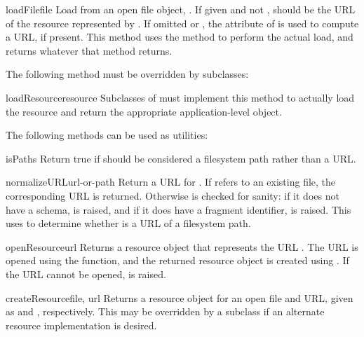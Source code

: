 \documentclass{howto}
\begin{document}
\begin{methoddesc}[loader]{loadFile}{file}
  Load from an open file object, .  If given and not
  ,  should be the URL of the resource represented
  by .  If omitted or , the 
  attribute of  is used to compute a  URL, if
  present.
  This method uses the  method to perform the
  actual load, and returns whatever that method returns.
\end{methoddesc}

The following method must be overridden by subclasses:

\begin{methoddesc}[loader]{loadResource}{resource}
  Subclasses of  must implement this method to
  actually load the resource and return the appropriate
  application-level object.
\end{methoddesc}

The following methods can be used as utilities:

\begin{methoddesc}[loader]{isPath}{s}
  Return true if  should be considered a filesystem path rather
  than a URL.
\end{methoddesc}

\begin{methoddesc}[loader]{normalizeURL}{url-or-path}
  Return a URL for .  If  refers to
  an existing file, the corresponding  URL is returned.
  Otherwise  is checked for sanity: if it
  does not have a schema,  is raised, and if it
  does have a fragment identifier,  is
  raised.
  This uses  to determine whether 
  is a URL of a filesystem path.
\end{methoddesc}

\begin{methoddesc}[loader]{openResource}{url}
  Returns a resource object that represents the URL .  The
  URL is opened using the  function, and
  the returned resource object is created using
  .  If the URL cannot be opened,
   is raised.
\end{methoddesc}

\begin{methoddesc}[loader]{createResource}{file, url}
  Returns a resource object for an open file and URL, given as
   and , respectively.  This may be overridden by a
  subclass if an alternate resource implementation is desired.
\end{methoddesc}
\end{document}
